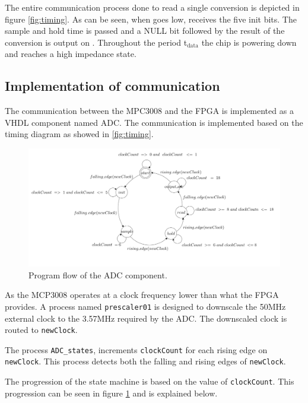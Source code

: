 The entire communication process done to read a single conversion is depicted in figure \ref{fig:timing}. As can be seen, when \cs goes low, \din receives the five init bits. The sample and hold time is passed and a NULL bit followed by the result of the conversion is output on \dout. Throughout the period t$_\text{data}$ the chip is powering down and \dout reaches a high impedance state.
\subsection{Implementation of communication}
The communication between the MPC3008 and the FPGA is implemented as a VHDL component named ADC. 
The communication is implemented based on the timing diagram as showed in \ref{fig:timing}.  

\begin{figure}[h!]
	\centering
	\centerline{\includegraphics[width=18cm]{images/statemachine}}
	\caption{Program flow of the ADC component.}
	\label{fig:statemachine}
\end{figure}

As the MCP3008 operates at a clock frequency lower than what the FPGA provides. 
A process named \texttt{prescaler01} is designed to downscale the 50MHz external clock to the 3.57MHz required by the ADC. 
The downscaled clock is routed to \texttt{newClock}.


The process \texttt{ADC\_states}, increments \texttt{clockCount} for each rising edge on \texttt{newClock}.
This process detects both the falling and rising edges of \texttt{newClock}.

The progression of the state machine is based on the value of \texttt{clockCount}. 
This progression can be seen in figure \ref{fig:statemachine} and is explained below.\\

